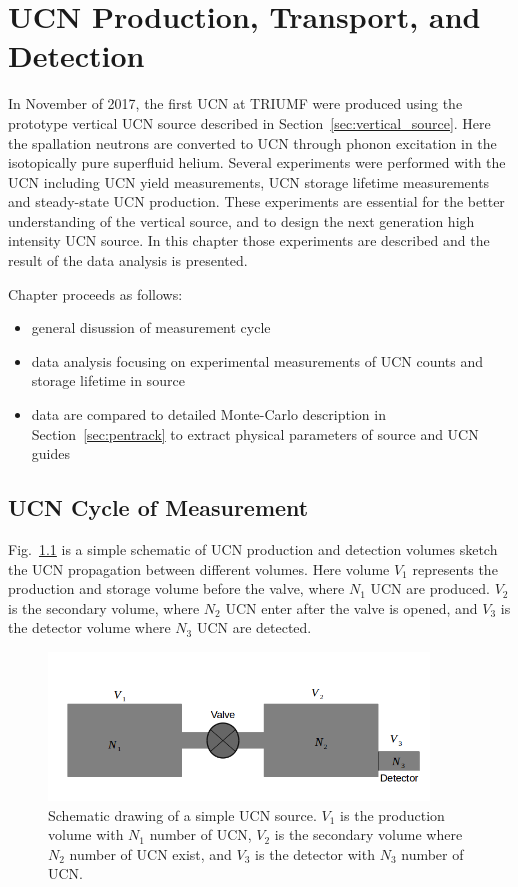\chapter{UCN Production, Transport, and
  Detection\label{chap:UCNresult}}

In November of 2017, the first UCN at TRIUMF were produced using the
prototype vertical UCN source described in
Section~\ref{sec:vertical_source}. Here the spallation neutrons are
converted to UCN through phonon excitation in the isotopically pure
superfluid helium. Several experiments were performed with the UCN
including UCN yield measurements, UCN storage lifetime measurements
and steady-state UCN production. These experiments are essential for
the better understanding of the vertical source, and to design the next
generation high intensity UCN source. In this chapter those
experiments are described and the result of the data analysis is
presented.

Chapter proceeds as follows:
\begin{itemize}
\item general disussion of measurement cycle
\item data analysis focusing on experimental measurements of UCN
  counts and storage lifetime in source
\item data are compared to detailed Monte-Carlo description in
  Section~\ref{sec:pentrack} to extract physical parameters of source
  and UCN guides
\end{itemize}

\section{UCN Cycle of Measurement}
Fig.~\ref{fig:volume_schematic} is a simple schematic of UCN
production and detection volumes sketch the UCN propagation between
different volumes. Here volume $V_1$ represents the production and
storage volume before the valve, where $N_1$ UCN are produced. $V_2$
is the secondary volume, where $N_2$ UCN enter after the valve is
opened, and $V_3$ is the detector volume where $N_3$ UCN are detected.


\begin{figure}[h]
  \centering
  \includegraphics[width=0.9\textwidth]{volume_schematic.png}
  \caption[Schematic drawing of a simple UCN source]{Schematic drawing
    of a simple UCN source. $V_1$ is the production volume with $N_1$
    number of UCN, $V_2$ is the secondary volume where $N_2$ number of
    UCN exist, and $V_3$ is the detector with $N_3$ number of UCN. }
  \label{fig:volume_schematic}
\end{figure}

